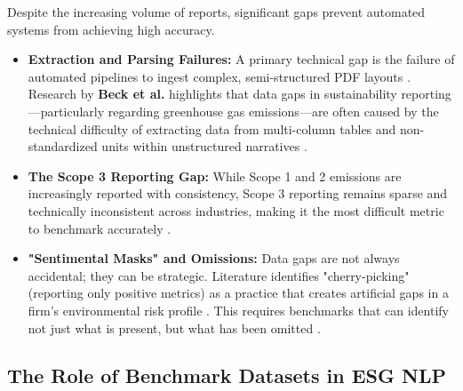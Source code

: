 \documentclass[english, online, cse, master]{dithesis}
\begin{document}
Despite the increasing volume of reports, significant gaps prevent automated systems from achieving high accuracy.
\begin{itemize}
\item 

\textbf{Extraction and Parsing Failures:} A primary technical gap is the failure of automated pipelines to ingest complex, semi-structured PDF layouts  \parencite[]{marco_bronzini_bf94d949, jacob_beck_9548a833}. Research by \textbf{Beck et al.} highlights that data gaps in sustainability reporting—particularly regarding greenhouse gas emissions—are often caused by the technical difficulty of extracting data from multi-column tables and non-standardized units within unstructured narratives  \parencite{jacob_beck_9548a833}.\item 

\textbf{The Scope 3 Reporting Gap:} While Scope 1 and 2 emissions are increasingly reported with consistency, Scope 3 reporting remains sparse and technically inconsistent across industries, making it the most difficult metric to benchmark accurately  \parencite{jacob_beck_9548a833}.\item 

\textbf{"Sentimental Masks" and Omissions:} Data gaps are not always accidental; they can be strategic. Literature identifies "cherry-picking" (reporting only positive metrics) as a practice that creates artificial gaps in a firm’s environmental risk profile  \parencite[]{xiaojia_wang_02351a60, julia_bingler_268445e3}. This requires benchmarks that can identify not just what is present, but what has been omitted  \parencite{julia_bingler_268445e3}.
\end{itemize}
\subsection{The Role of Benchmark Datasets in ESG NLP}
\end{document}

